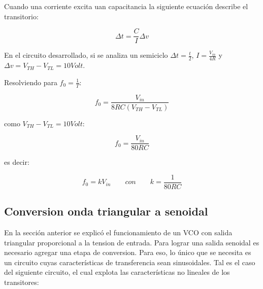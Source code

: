 Cuando una corriente excita uan capacitancia la siguiente ecuación describe el transitorio:

\begin{equation}
\Delta t = \frac{C}{I}\Delta v
\end{equation}

En el circuito desarrollado, si se analiza un semiciclo $\Delta t = \frac{t}{2}$, $I = \frac{V_{in}}{4R}$ y $\Delta v = V_{TH} - V_{TL} = 10  Volt$.

Resolviendo para $f_0 = \frac{1}{T}$:

\begin{equation}
f_0 = \frac{V_{in}}{8RC(V_{TH} - V_{TL})}
\end{equation}

como $V_{TH} - V_{TL} = 10  Volt$:

\begin{equation}
f_0 = \frac{V_{in}}{80RC}
\end{equation}

es decir:

\begin{equation}
f_0 = kV_{in} \qquad con \qquad k = \frac{1}{80RC}
\end{equation}


\subsection{Conversion onda triangular a senoidal}
En la sección anterior se explicó el funcionamiento de un VCO con salida triangular proporcional a la tension de entrada. Para lograr una salida senoidal es necesario agregar una etapa de conversion. Para eso, lo único que se necesita es un circuito cuyas características de transferencia sean sinusoidales. Tal es el caso del siguiente circuito, el cual explota las características no lineales de los transitores:


